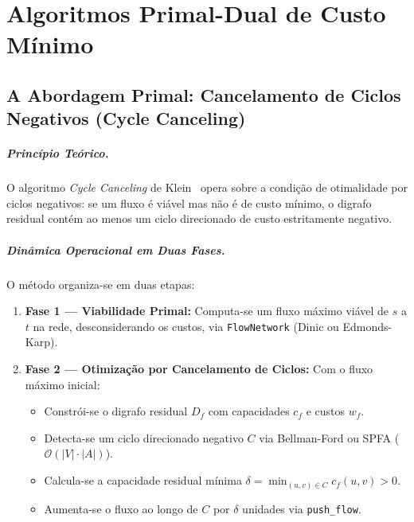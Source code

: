 \chapter{Algoritmos Primal-Dual de Custo Mínimo}\label{sec:algoritmos_mcf}

\section{A Abordagem Primal: Cancelamento de Ciclos Negativos (Cycle Canceling)}\label{sec:cycle_canceling}

\paragraph{Princípio Teórico.}
O algoritmo \textit{Cycle Canceling} de Klein~\cite{klein1967primal} opera sobre a condição de otimalidade por ciclos negativos: se um fluxo é viável mas não é de custo mínimo, o digrafo residual contém ao menos um ciclo direcionado de custo estritamente negativo.

\paragraph{Dinâmica Operacional em Duas Fases.}
O método organiza-se em duas etapas:

\begin{enumerate}
    \item \textbf{Fase 1 --- Viabilidade Primal:} Computa-se um fluxo máximo viável de $s$ a $t$ na rede, desconsiderando os custos, via \lstinline{FlowNetwork} (Dinic ou Edmonds-Karp).

    \item \textbf{Fase 2 --- Otimização por Cancelamento de Ciclos:} Com o fluxo máximo inicial:
    \begin{itemize}
        \item Constrói-se o digrafo residual $D_f$ com capacidades $c_f$ e custos $w_f$.
        \item Detecta-se um ciclo direcionado negativo $C$ via Bellman-Ford ou SPFA ($\mathcal{O}(|V| \cdot |A|)$).
        \item Calcula-se a capacidade residual mínima $\delta = \min_{(u,v) \in C} c_f(u,v) > 0$.
        \item Aumenta-se o fluxo ao longo de $C$ por $\delta$ unidades via \lstinline{push_flow}.
    \end{itemize}
\end{enumerate}

